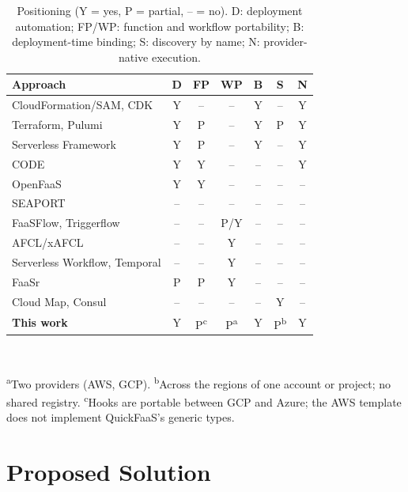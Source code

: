 \documentclass[conference]{IEEEtran}
\begin{document}
\begin{table}[t]
  \centering
  \caption{Positioning (Y = yes, P = partial, -- = no). D: deployment automation; FP/WP: function
  and workflow portability; B: deployment-time binding; S: discovery by name; N: provider-native
  execution.}
  \label{tab:related}
  \footnotesize
  \setlength{\tabcolsep}{3.2pt}
  \begin{tabular}{|l|c|c|c|c|c|c|}
    \hline
    \textbf{Approach} & \textbf{D} & \textbf{FP} & \textbf{WP} & \textbf{B} & \textbf{S} & \textbf{N} \\
    \hline
    CloudFormation/SAM, CDK      & Y & -- & -- & Y & -- & Y \\
    \hline
    Terraform, Pulumi            & Y & P  & -- & Y & P  & Y \\
    \hline
    Serverless Framework         & Y & P  & -- & Y & -- & Y \\
    \hline
    CODE~\cite{ristov2024code}   & Y & Y  & -- & -- & -- & Y \\
    \hline
    OpenFaaS                     & Y & Y  & -- & -- & -- & -- \\
    \hline
    SEAPORT                      & -- & -- & -- & -- & -- & -- \\
    \hline
    FaaSFlow, Triggerflow        & -- & -- & P/Y & -- & -- & -- \\
    \hline
    AFCL/xAFCL                   & -- & -- & Y & -- & -- & -- \\
    \hline
    Serverless Workflow, Temporal & -- & -- & Y & -- & -- & -- \\
    \hline
    FaaSr                        & P & P  & Y & -- & -- & -- \\
    \hline
    Cloud Map, Consul            & -- & -- & -- & -- & Y & -- \\
    \hline
    \textbf{This work}           & Y & P\textsuperscript{c} & P\textsuperscript{a} & Y & P\textsuperscript{b} & Y \\
    \hline
  \end{tabular}\\[2pt]
  \parbox{\columnwidth}{\scriptsize \textsuperscript{a}Two providers (AWS, GCP).
  \textsuperscript{b}Across the regions of one account or project; no shared registry.
  \textsuperscript{c}Hooks are portable between GCP and Azure; the AWS template does not implement
  QuickFaaS's generic types.}
\end{table}

\section{Proposed Solution}
\label{sec:solution}
\end{document}
